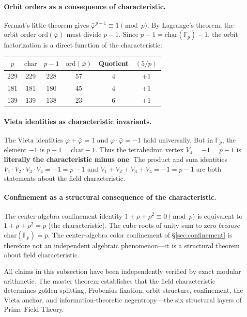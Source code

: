 \paragraph{Orbit orders as a consequence of characteristic.}
Fermat's little theorem gives $\bar\varphi^{p-1} \equiv 1 \pmod{p}$. By Lagrange's theorem, the orbit order $\mathrm{ord}(\bar\varphi)$ must divide $p - 1$. Since $p - 1 = \mathrm{char}(\mathbb{F}_p) - 1$, the orbit factorization is a direct function of the characteristic:

\begin{center}
\begin{tabular}{@{}cccccc@{}}
\toprule
$p$ & $\mathrm{char}$ & $p - 1$ & $\mathrm{ord}(\bar\varphi)$ & Quotient & $(5/p)$ \\
\midrule
229 & 229 & 228 & 57 & 4 & $+1$ \\
181 & 181 & 180 & 45 & 4 & $+1$ \\
139 & 139 & 138 & 23 & 6 & $+1$ \\
\bottomrule
\end{tabular}
\end{center}

\paragraph{Vieta identities as characteristic invariants.}
The Vieta identities $\varphi + \bar\varphi = 1$ and $\varphi \cdot \bar\varphi = -1$ hold universally. But in $\mathbb{F}_p$, the element $-1$ is $p - 1 = \mathrm{char} - 1$. Thus the tetrahedron vertex $V_4 = -1 = p - 1$ is \textbf{literally the characteristic minus one}. The product and sum identities $V_1 \cdot V_2 \cdot V_3 \cdot V_4 = -1 = p - 1$ and $V_1 + V_2 + V_3 + V_4 = -1 = p - 1$ are both statements about the field characteristic.

\paragraph{Confinement as a structural consequence of the characteristic.}
The center-algebra confinement identity $1 + \rho + \rho^2 \equiv 0 \pmod{p}$ is equivalent to $1 + \rho + \rho^2 = p$ (the characteristic). The cube roots of unity sum to zero \emph{because} $\mathrm{char}(\mathbb{F}_p) = p$. The center-algebra color confinement of \S\ref{sec:confinement} is therefore not an independent algebraic phenomenon---it is a structural theorem about field characteristic.

\begin{remark}
All claims in this subsection have been independently verified by exact modular arithmetic. The master theorem establishes that the field characteristic determines golden splitting, Frobenius fixation, orbit structure, confinement, the Vieta anchor, and information-theoretic negentropy---the six structural layers of Prime Field Theory.
\end{remark}

